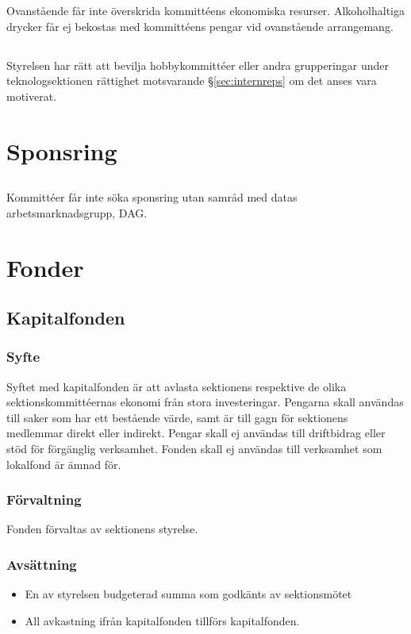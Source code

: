 \documentclass[a4paper, 10pt]{article}
\begin{document}
Ovanstående får inte överskrida kommittéens ekonomiska resurser. Alkoholhaltiga drycker får ej bekostas med kommittéens pengar vid ovanstående arrangemang.

\subsection{}
Styrelsen har rätt att bevilja hobbykommittéer eller andra grupperingar under teknologsektionen rättighet motsvarande §\ref{sec:internreps} om det anses vara motiverat.

\section{Sponsring}
\subsection{}
Kommittéer får inte söka sponsring utan samråd med datas
arbetsmarknadsgrupp, DAG.

\section{Fonder}
\subsection{Kapitalfonden}
\subsubsection{Syfte}
\label{sec:kapitalfond_syfte}
Syftet med kapitalfonden är att avlasta sektionens respektive de olika sektionskommittéernas ekonomi från stora investeringar. Pengarna skall användas till saker som har ett bestående värde, samt är till gagn för sektionens medlemmar direkt eller indirekt. Pengar skall ej användas till driftbidrag eller stöd för förgänglig verksamhet. Fonden skall ej användas till verksamhet som lokalfond är ämnad för.
\subsubsection{Förvaltning}
Fonden förvaltas av sektionens styrelse.
\subsubsection{Avsättning}
\begin{itemize}
\item En av styrelsen budgeterad summa som godkänts av sektionsmötet
\item All avkastning ifrån kapitalfonden tillförs kapitalfonden.
\end{itemize}
\end{document}
